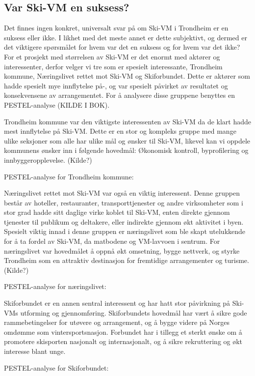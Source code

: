 \subsection{Var Ski-VM en suksess?}
Det finnes ingen konkret, universalt svar på om Ski-VM i Trondheim er en suksess eller ikke.  I likhet med det meste annet er dette subjektivt, og dermed er det viktigere spørsmålet for hvem var det en suksess og for hvem var det ikke? For et prosjekt med størrelsen av Ski-VM er det enormt med aktører og interessenter, derfor velger vi tre som er spesielt interessante, Trondheim kommune, Næringslivet rettet mot Ski-VM og Skiforbundet. Dette er aktører som hadde spesielt mye innflytelse på-, og var spesielt påvirket av resultatet og konsekvensene av arrangementet. For å analysere disse gruppene benyttes en PESTEL-analyse (KILDE I BOK).

Trondheim kommune var den viktigste interessenten av Ski-VM da de klart hadde mest innflytelse på Ski-VM. Dette er en stor og kompleks gruppe med mange ulike seksjoner som alle har ulike mål og ønsker til Ski-VM, likevel kan vi oppdele kommunens ønsker inn i følgende hovedmål: Økonomisk kontroll, byprofilering og innbyggeropplevelse. (Kilde?)

PESTEL-analyse for Trondheim kommune:

Næringslivet rettet mot Ski-VM var også en viktig interessent. Denne gruppen består av hoteller, restauranter, transporttjenester og andre virksomheter som i stor grad hadde sitt daglige virke koblet til Ski-VM, enten direkte gjennom tjenester til publikum og deltakere, eller indirekte gjennom økt aktivitet i byen. Spesielt viktig innad i denne gruppen er næringslivet som ble skapt utelukkende for å ta fordel av Ski-VM, da matbodene og VM-lavvoen i sentrum. For næringslivet var hovedmålet å oppnå økt omsetning, bygge nettverk, og styrke Trondheim som en attraktiv destinasjon for fremtidige arrangementer og turisme. (Kilde?)

PESTEL-analyse for næringslivet:


Skiforbundet er en annen sentral interessent og har hatt stor påvirkning på Ski-VMs utforming og gjennomføring. Skiforbundets hovedmål har vært å sikre gode rammebetingelser for utøvere og arrangement, og å bygge videre på Norges omdømme som vintersportsnasjon. Forbundet har i tillegg et sterkt ønske om å promotere skisporten nasjonalt og internasjonalt, og å sikre rekruttering og økt interesse blant unge.

PESTEL-analyse for Skiforbundet:
